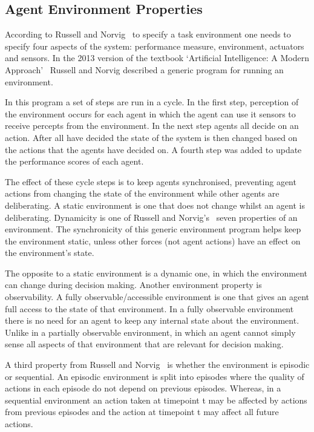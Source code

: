 \documentclass[]{final_report}
\begin{document}
\subsection{Agent Environment Properties}
\label{appendix:agentenvprop}
According to Russell and Norvig~\cite{russell2016artificial} to specify a task environment one needs to specify four aspects of the system: performance measure, environment, actuators and sensors. In the 2013 version of the textbook `Artificial Intelligence: A Modern Approach'~\cite{russell2011artificial} Russell and Norvig described a generic program for running an environment.\par 
In this program a set of steps are run in a cycle. In the first step, perception of the environment occurs for each agent in which the agent can use it sensors to receive percepts from the environment. In the next step agents all decide on an action. After all have decided the state of the system is then changed based on the actions that the agents have decided on. A fourth step was added to update the performance scores of each agent.\par 
The effect of these cycle steps is to keep agents synchronised, preventing agent actions from changing the state of the environment while other agents are deliberating. A static environment is one that does not change whilst an agent is deliberating. Dynamicity is one of Russell and Norvig's~\cite{russell2016artificial} seven properties of an environment. The synchronicity of this generic environment program helps keep the environment static, unless other forces (not agent actions) have an effect on the environment's state.\par 
The opposite to a static environment is a dynamic one, in which the environment can change during decision making. Another environment property is observability. A fully observable/accessible environment is one that gives an agent full access to the state of that environment. In a fully observable environment there is no need for an agent to keep any internal state about the environment. Unlike in a partially observable environment, in which an agent cannot simply sense all aspects of that environment that are relevant for decision making.\par 
A third property from Russell and Norvig~\cite{russell2016artificial} is whether the environment is episodic or sequential. An episodic environment is split into episodes where the quality of actions in each episode do not depend on previous episodes. Whereas, in a sequential environment an action taken at timepoint t may be affected by actions from previous episodes and the action at timepoint t may affect all future actions.\par 
\end{document}
